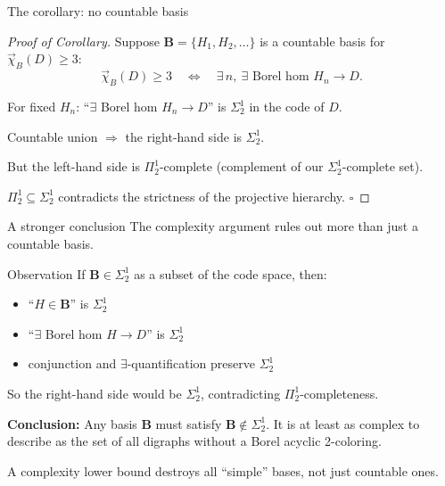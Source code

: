 \documentclass[aspectratio=169, 12pt]{beamer}
\newcommand{\vchi}{\vec{\chi}_B}
\begin{document}
\begin{frame}{The corollary: no countable basis}
\begin{proof}[Proof of Corollary]
Suppose $\mathbf{B} = \{H_1, H_2, \ldots\}$ is a countable basis for $\vchi(D) \geq 3$:
$$
\vchi(D) \geq 3
\quad\Longleftrightarrow\quad
\exists\, n,\ \exists\text{ Borel hom } H_n \to D.
$$

\pause
\medskip

For fixed $H_n$: ``$\exists$ Borel hom $H_n \to D$'' is $\Sigma^1_2$ in the code of $D$.

\medskip

Countable union $\Rightarrow$ the right-hand side is $\Sigma^1_2$.

\medskip

But the left-hand side is $\Pi^1_2$-complete (complement of our $\Sigma^1_2$-complete set).

\medskip

$\Pi^1_2 \subseteq \Sigma^1_2$ contradicts the strictness of the projective hierarchy. \hfill$\square$
\end{proof}
\end{frame}

\begin{frame}{A stronger conclusion}
The complexity argument rules out more than just a countable basis.

\medskip

\begin{block}{Observation}
If $\mathbf{B} \in \Sigma^1_2$ as a subset of the code space, then:
\begin{itemize}
	\item ``$H \in \mathbf{B}$'' is $\Sigma^1_2$
	\item ``$\exists$ Borel hom $H \to D$'' is $\Sigma^1_2$
	\item conjunction and $\exists$-quantification preserve $\Sigma^1_2$
\end{itemize}
So the right-hand side would be $\Sigma^1_2$, contradicting $\Pi^1_2$-completeness.
\end{block}

\pause
\medskip

\textbf{Conclusion:} Any basis $\mathbf{B}$ must satisfy $\mathbf{B} \notin \Sigma^1_2$. It is at least as complex to describe as the set of all digraphs without a Borel acyclic 2-coloring.

\medskip

\alert{A complexity lower bound destroys all ``simple'' bases, not just countable ones.}
\end{frame}
\end{document}
